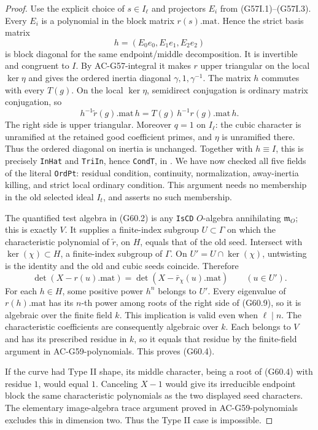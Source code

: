 \begin{proof}
Use the explicit choice of \(s\in I_\ell\) and
projectors \(E_i\) from (G57I.1)--(G57I.3).
Every \(E_i\) is a polynomial in the block matrix
\(r(s).\mathrm{mat}\).  Hence the strict basis matrix
\[
                  h=(E_0e_0,E_1e_1,E_2e_2)
 \tag{G60.7}
\]
is block diagonal for the same endpoint/middle
decomposition.  It is invertible and congruent to \(I\).
By AC-G57-integral it makes \(r\) upper triangular on the
local \(\ker\eta\) and gives the ordered inertia diagonal
\(\gamma,1,\gamma^{-1}\).
The matrix \(h\) commutes with every \(T(g)\).
On the local \(\ker\eta\), semidirect conjugation is
ordinary matrix conjugation, so
\[
 h^{-1}\widetilde r(g).\mathrm{mat}\,h
     =T(g)\,h^{-1}r(g).\mathrm{mat}\,h.
 \tag{G60.8}
\]
The right side is upper triangular.
Moreover \(q=1\) on \(I_\ell\): the cubic character is
unramified at the retained good coefficient primes,
and \(\eta\) is unramified there.
Thus the ordered diagonal on inertia is unchanged.
Together with \(h\equiv I\), this is precisely
\texttt{InHat} and \texttt{TriIn}, hence \texttt{CondT},
in
.
We have now checked all five fields of the literal
\texttt{OrdPt}: residual condition, continuity,
normalization, away-inertia killing, and strict local
ordinary condition.
This argument needs no membership in the old selected
ideal \(I_t\), and asserts no such membership.

The quantified test algebra in (G60.2) is any
\texttt{IsCD} \(O\)-algebra annihilating
\(\mathfrak m_O\); this is exactly \(V\).
It supplies a finite-index subgroup \(U\subset\Gamma\)
on which the characteristic polynomial of
\(\widetilde r\), on \(H\), equals that of the old seed.
Intersect with \(\ker(\chi)\subset H\), a finite-index
subgroup of \(\Gamma\).  On
\(U'=U\cap\ker(\chi)\), untwisting is the identity
and the old and cubic seeds coincide.  Therefore
\[
 \det(X-r(u).\mathrm{mat})
        =\det(X-\bar r_\chi(u).\mathrm{mat})
                     \qquad(u\in U').
 \tag{G60.9}
\]
For each \(h\in H\), some positive power \(h^n\)
belongs to \(U'\).  Every eigenvalue of
\(r(h).\mathrm{mat}\) has its \(n\)-th power among
roots of the right side of (G60.9), so it is algebraic
over the finite field \(k\).  This implication is
valid even when \(\ell\mid n\).
The characteristic coefficients are consequently
algebraic over \(k\).  Each belongs to \(V\) and has
its prescribed residue in \(k\), so it equals that
residue by the finite-field argument in
AC-G59-polynomials.  This proves (G60.4).

If the curve had Type II shape, its middle character,
being a root of (G60.4) with residue \(1\), would equal
\(1\).  Canceling \(X-1\) would give its irreducible
endpoint block the same characteristic polynomials
as the two displayed seed characters.
The elementary image-algebra trace argument proved in
AC-G59-polynomials excludes this in dimension two.
Thus the Type II case is impossible.
\end{proof}

